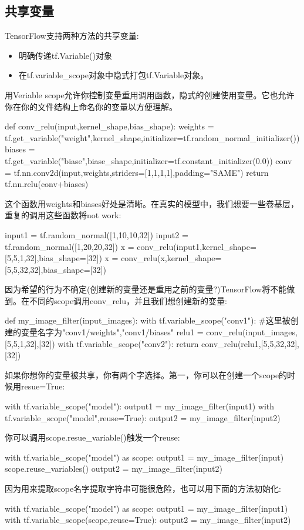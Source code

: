 \subsection{共享变量}
TensorFlow支持两种方法的共享变量:
\begin{itemize}
	\item 明确传递tf.Variable()对象
	\item 在tf.variable\_scope对象中隐式打包tf.Variable对象。
\end{itemize}
用Veriable scope允许你控制变量重用调用函数，隐式的创建使用变量。它也允许你在你的文件结构上命名你的变量以方便理解。
\begin{python}
def conv_relu(input,kernel_shape,bias_shape):
    weights = tf.get_variable("weight",kernel_shape,initializer=tf.random_normal_initializer())
    biases = tf.get_variable("biase",biase_shape,initializer=tf.constant_initializer(0.0))
    conv = tf.nn.conv2d(input,weights,striders=[1,1,1,1],padding="SAME")
    return tf.nn.relu(conv+biases)
\end{python}
这个函数用weights和biases好处是清晰。在真实的模型中，我们想要一些卷基层，重复的调用这些函数将not work:
\begin{python}
input1 = tf.random_normal([1,10,10,32])
input2 = tf.random_normal([1,20,20,32])
x = conv_relu(input1,kernel_shape=[5,5,1,32],bias_shape=[32])
x = conv_relu(x,kernel_shape=[5,5,32,32],bias_shape=[32])
\end{python}
因为希望的行为不确定(创建新的变量还是重用之前的变量?)TensorFlow将不能做到。在不同的scope调用conv\_relu，并且我们想创建新的变量:
\begin{python}
def my_image_filter(input_images):
    with tf.variable_scope("conv1"):
    #这里被创建的变量名字为"conv1/weights","conv1/biases"
        relu1 = conv_relu(input_images,[5,5,1,32],[32])
    with tf.variable_scope("conv2"):
	return conv_relu(relu1,[5,5,32,32],[32])
\end{python}
如果你想你的变量被共享，你有两个字选择。第一，你可以在创建一个scope的时候用resue=True:
\begin{python}
with tf.variable_scope("model"):
    output1 = my_image_filter(input1)
with tf.variable_scope("model",reuse=True):
    output2 = my_image_filter(input2)
\end{python}
你可以调用scope.resue\_variable()触发一个reuse:
\begin{python}
with tf.variable_scope("model") as scope:
    output1 = my_image_filter(input)
    scope.reuse_variables()
    output2 = my_image_filter(input2)
\end{python}
因为用来提取scope名字提取字符串可能很危险，也可以用下面的方法初始化:
\begin{python}
with tf.variable_scope("model") as scope:
    output1 = my_image_filter(input1)
with tf.variable_scope(scope,reuse=True):
    output2 = my_image_filter(input2)
\end{python}

